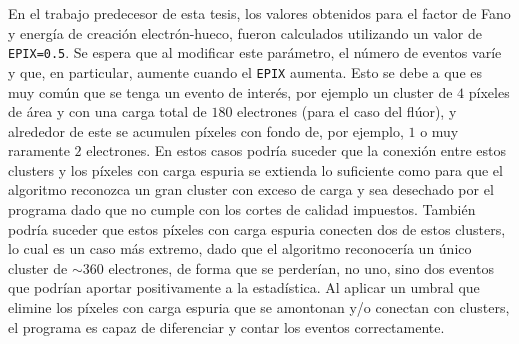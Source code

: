 En el trabajo predecesor de esta tesis\cite{TesisKevin}, los valores obtenidos para el factor de Fano y energía de creación electrón-hueco, fueron calculados utilizando un valor de \verb|EPIX=0.5|. Se espera que al modificar este parámetro, el número de eventos varíe y que, en particular, aumente cuando el \verb|EPIX| aumenta. Esto se debe a que es muy común que se tenga un evento de interés, por ejemplo un cluster de $4$ píxeles de área y con una carga total de $180$ electrones (para el caso del flúor), y alrededor de este se acumulen píxeles con fondo de, por ejemplo, $1$ o muy raramente $2$ electrones. En estos casos podría suceder que la conexión entre estos clusters y los píxeles con carga espuria se extienda lo suficiente como para que el algoritmo reconozca un gran cluster con exceso de carga y sea desechado por el programa dado que no cumple con los cortes de calidad impuestos. También podría suceder que estos píxeles con carga espuria conecten dos de estos clusters, lo cual es un caso más extremo, dado que el algoritmo reconocería un único cluster de $\sim 360$ electrones, de forma que se perderían, no uno, sino dos eventos que podrían aportar positivamente a la estadística. Al aplicar un umbral que elimine los píxeles con carga espuria que se amontonan y/o conectan con clusters, el programa es capaz de diferenciar y contar los eventos correctamente.

